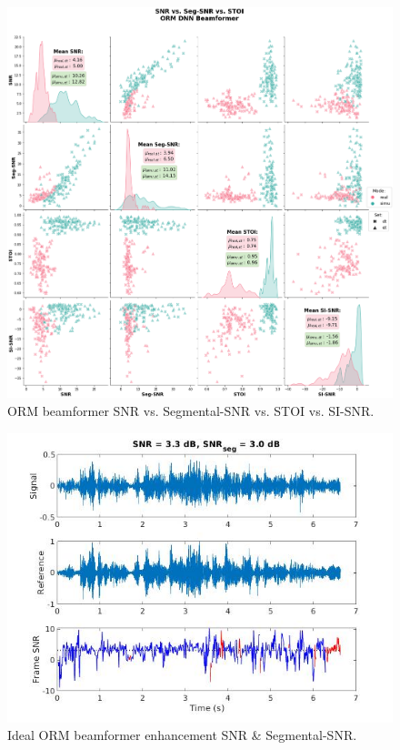 \begin{figure}[H]
    \centering
    \includegraphics[width=\linewidth]{Features/images/orm_snr_stoi}
    \caption{ORM beamformer SNR vs. Segmental-SNR vs. STOI vs. SI-SNR.}\label{fig:orm_snr_stoi}
\end{figure}

\begin{figure}[H]
    \centering
    \includegraphics[width=\linewidth]{Features/images/orm_ideal_snr}
    \caption{Ideal ORM beamformer enhancement SNR \& Segmental-SNR.}\label{fig:orm_ideal_snr}
\end{figure}

